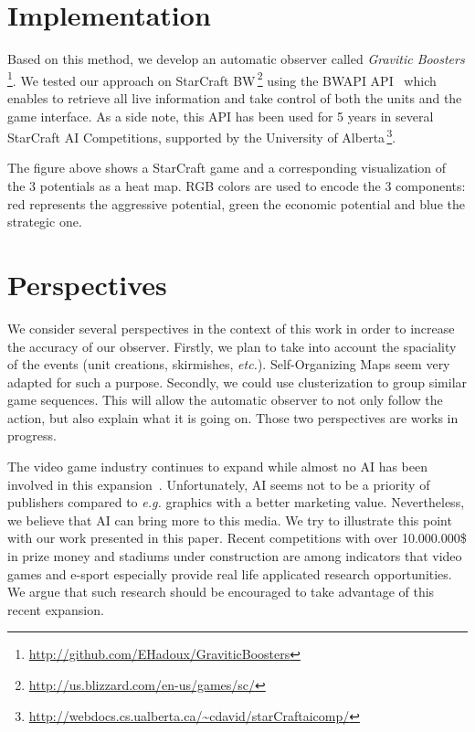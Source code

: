 \documentclass{jfsma}
\begin{document}
\section{Implementation}

Based on this method, we develop an automatic observer called \emph{Gravitic Boosters}\,\footnote{\url{http://github.com/EHadoux/GraviticBoosters}}.
We tested our approach on StarCraft BW\,\footnote{\url{http://us.blizzard.com/en-us/games/sc/}} using
the BWAPI API~\cite{bwapi} which enables to retrieve all live information and take control of both the units and the game interface.
As a side note, this API has been used for 5 years in several StarCraft AI Competitions, supported by the University of Alberta\,\footnote{\url{http://webdocs.cs.ualberta.ca/~cdavid/starCraftaicomp/}}. %

The figure above shows a StarCraft game and a corresponding visualization of the 3 potentials as a heat map.
RGB colors are used to encode the 3 components: red represents the aggressive potential, green the economic potential and blue the strategic one.

\section{Perspectives}
We consider several perspectives in the context of this work in order to increase the accuracy of our observer.
Firstly, we plan to take into account the spaciality of the events (unit creations, skirmishes, \emph{etc.}). %
Self-Organizing Maps seem very adapted for such a purpose.
Secondly, we could use clusterization to group similar game sequences.
This will allow the automatic observer to not only follow the action, but also explain what it is going on.
Those two perspectives are works in progress.

The video game industry continues to expand while almost no AI has been involved in this expansion~\cite{miikkulainen2007creating}.
Unfortunately, AI seems not to be a priority of publishers compared to \textit{e.g.} graphics with a better marketing value.
Nevertheless, we believe that AI can bring more to this media.
We try to illustrate this point with our work presented in this paper.
Recent competitions with over 10.000.000\$ in prize money and stadiums under construction are among indicators that video games and e-sport especially provide real life applicated research opportunities.
We argue that such research should be encouraged to take advantage of this recent expansion.



\end{document}
